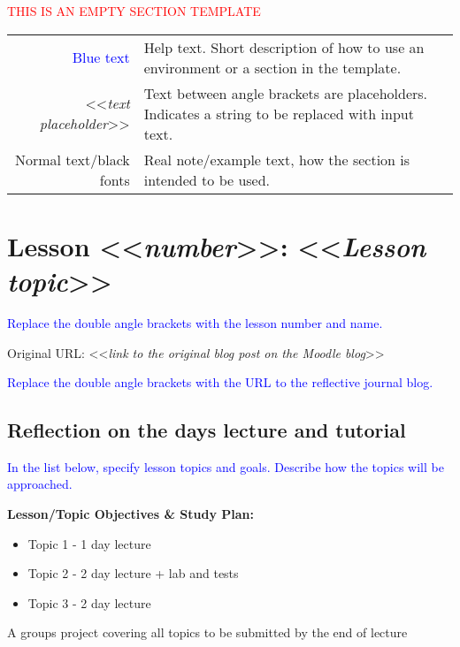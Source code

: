 

{\begin{center}
    \textcolor{red}{\Huge{THIS IS AN EMPTY SECTION TEMPLATE}}

    \begin{tabular}{r @{: } p{80mm}}
        {\textcolor{blue}{Blue text}} &  Help text. Short description of how to use an environment or a section in the template.\\
        <<{\emph{text placeholder}}>> & Text between angle brackets are placeholders. Indicates a string to be replaced with input text.\\
        Normal text/black fonts & Real note/example text, how the section is intended to be used.
    \end{tabular}

\end{center}


\section{Lesson <<{\emph{number}}>>: <<{\emph{Lesson topic}}>>}

{\textcolor{blue}{Replace the double angle brackets with the lesson number and name.}}

Original URL: <<{\emph{link to the original blog post on the Moodle blog}}>>

{\textcolor{blue}{Replace the double angle brackets with the URL to the reflective journal blog.}}


\subsection{Reflection on the days lecture and tutorial}

{\textcolor{blue}{In the list below, specify lesson topics and goals. Describe how the topics will be approached.}}

{\bfseries{Lesson/Topic Objectives \& Study Plan:}}
\begin{itemize}
    \item Topic 1 - 1 day lecture
    \item Topic 2 - 2 day lecture + lab and tests
    \item Topic 3 - 2 day lecture
\end{itemize}

A groups project covering all topics to be submitted by the end of lecture}

